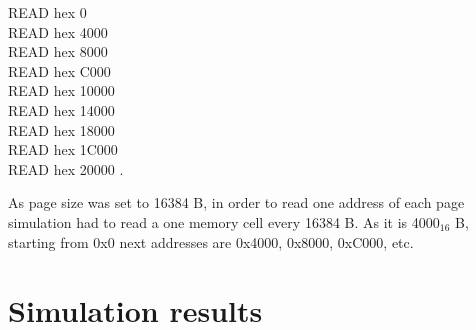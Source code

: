 \documentclass{article}
\begin{document}
\noindent
\ttfamily
READ hex 0\\
READ hex 4000\\
READ hex 8000\\
READ hex C000\\
READ hex 10000\\
READ hex 14000\\
READ hex 18000\\
READ hex 1C000\\
READ hex 20000
\rmfamily
.

As page size was set to 16384 B, in order to read one address of each page simulation had
to read a one memory cell every  16384 B. As it is 4000$_{16}$ B, starting from 0x0 next addresses
are 0x4000, 0x8000, 0xC000, etc.

\section{Simulation results}
\end{document}
